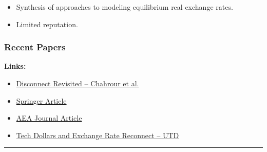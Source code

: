 \documentclass[
  11pt,
]{article}
\providecommand{\tightlist}{%
  \setlength{\itemsep}{0pt}\setlength{\parskip}{0pt}}
\begin{document}
\begin{itemize}
\tightlist
\item
  Synthesis of approaches to modeling equilibrium real exchange rates.
\item
  Limited reputation.
\end{itemize}

\subsubsection{Recent Papers}\label{recent-papers}

\textbf{Links:}

\begin{itemize}
\tightlist
\item
  \href{https://chahrour.github.io/papers/Disconnect_revisited.pdf?utm_source=chatgpt.com}{Disconnect
  Revisited -- Chahrour et al.}
\item
  \href{https://link.springer.com/article/10.1057/s41308-024-00251-0}{Springer
  Article}
\item
  \href{https://www.aeaweb.org/articles?from=f&id=10.1257\%2Fmac.20210445&utm_source=chatgpt.com}{AEA
  Journal Article}
\item
  \href{https://bpb-us-e2.wpmucdn.com/sites.utdallas.edu/dist/8/1090/files/2024/08/Tech-Dollars-and-Exchange-Rate-Reconnect.pdf?utm_source=chatgpt.com}{Tech
  Dollars and Exchange Rate Reconnect -- UTD}
\end{itemize}

\begin{center}\rule{0.5\linewidth}{0.5pt}\end{center}


\printbibliography
\end{document}
